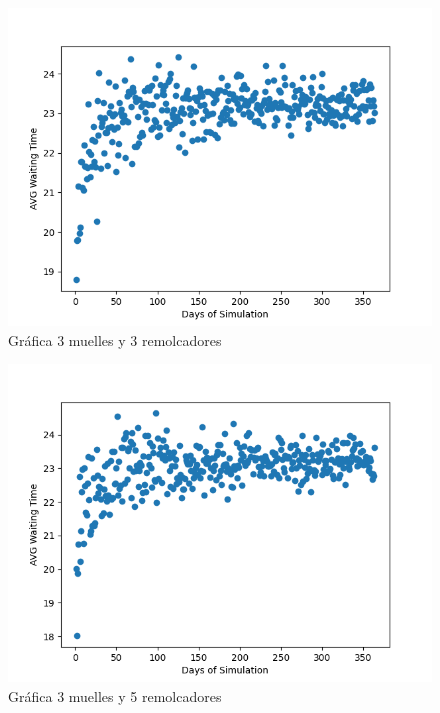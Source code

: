 \documentclass[titlepage,11pt]{scrartcl}
\begin{document}
	\begin{figure}[htb]
		\begin{center}
			\includegraphics[width=\columnwidth]{./g1.png}
		\end{center}
		\caption{Gr\'afica 3 muelles y 3 remolcadores}
	\end{figure}

	\begin{figure}[htb]
		\begin{center}
			\includegraphics[width=\columnwidth]{./g2.png}
		\end{center}
		\caption{Gr\'afica 3 muelles y 5 remolcadores}
	\end{figure}
	
\end{document}
